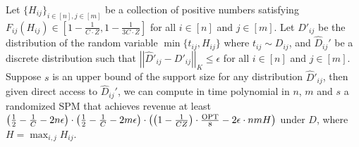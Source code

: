 \begin{lemma}\label{lem:UD additive bound}
	Let $\{H_{ij}\}_{i\in[n],j\in[m]}$ be a collection of positive numbers satisfying $F_{ij}(H_{ij})\in [1-\frac{1}{C\cdot Z}, 1-\frac{1}{3C\cdot Z}]$ for all $i\in[n]$ and $j\in[m]$. Let $D'_{ij}$ be the distribution of the random variable $\min\{t_{ij}, H_{ij}\}$ where $t_{ij}\sim D_{ij}$, and $\hat{D}_{ij}'$ be a discrete distribution such that $\left|\left|\hat{D}'_{ij}-D'_{ij}\right|\right|_K\leq \epsilon$ for all $i\in[n]$ and $j\in[m]$. Suppose $s$ is an upper bound of the support size for any distribution $\hat{D}'_{ij}$, then given direct access to $\hat{D}_{ij}'$, we can compute in time polynomial in $n$, $m$ and $s$ a randomized SPM that achieves revenue at least $\left(\frac{1}{2}-\frac{1}{C}-2n\epsilon\right)\cdot\left(\frac{1}{2}-\frac{1}{C}-2m\epsilon\right)\cdot \left(\left(1-\frac{1}{ CZ}\right)\cdot \frac{\text{OPT}}{8}-2\epsilon\cdot nmH\right)$ under $D$, where $H= \max_{i,j} H_{ij}$. 
\end{lemma}
